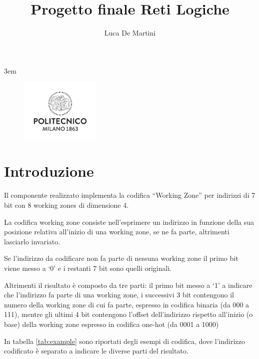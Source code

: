 \documentclass[a4paper]{article}
\title{Progetto finale Reti Logiche}
\author{Luca De Martini}
\date{}
\begin{document}
\setlength\parindent{0pt}
\emergencystretch 3em

\begin{figure}[t]
  \includegraphics[height=3cm]{logoPoli.pdf}
\end{figure}

\maketitle

\section{Introduzione}

Il componente realizzato implementa la codifica ``Working Zone'' per indirizzi di 7 bit con 8 working zones di dimensione 4.

La codifica working zone consiste nell'esprimere un indirizzo in funzione della sua posizione relativa all'inizio di una working zone, se ne fa parte, altrimenti lasciarlo invariato.

Se l'indirizzo da codificare non fa parte di nessuna working zone il primo bit viene messo a `0' e i restanti 7 bit sono quelli originali.

Altrimenti il risultato è composto da tre parti: il primo bit messo a `1' a indicare che l'indirizzo fa parte di una working zone, i successivi 3 bit contengono il numero della working zone di cui fa parte, espresso in codifica binaria (da 000 a 111), mentre gli ultimi 4 bit contengono l'offset dell'indirizzo rispetto all'inizio (o base) della working zone espresso in codifica one-hot (da 0001 a 1000)

In tabella \ref{tab:example} sono riportati degli esempi di codifica, dove l'indirizzo codificato è separato a indicare le diverse parti del risultato.
\end{document}
